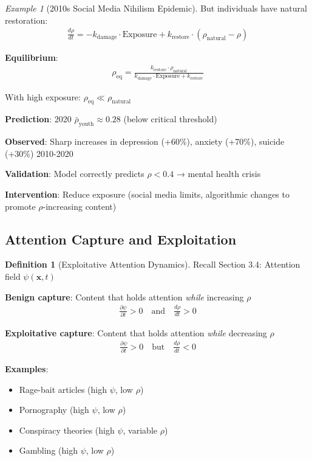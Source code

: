 \documentclass[11pt,a4paper]{article}
\theoremstyle{definition}
\newtheorem{definition}{Definition}[section]
\theoremstyle{remark}
\newtheorem{example}{Example}[section]
\begin{document}
\begin{enumerate}
\begin{example}[2010s Social Media Nihilism Epidemic]
But individuals have natural restoration:
\begin{align}
\frac{d\rho}{dt} = -k_{\text{damage}} \cdot \text{Exposure} + k_{\text{restore}} \cdot (\rho_{\text{natural}} - \rho)
\end{align}

\textbf{Equilibrium}:
\begin{align}
\rho_{\text{eq}} = \frac{k_{\text{restore}} \cdot \rho_{\text{natural}}}{k_{\text{damage}} \cdot \text{Exposure} + k_{\text{restore}}}
\end{align}

With high exposure: \(\rho_{\text{eq}} \ll \rho_{\text{natural}}\)

\textbf{Prediction}: 2020 \(\bar{\rho}_{\text{youth}} \approx 0.28\) (below critical threshold)

\textbf{Observed}: Sharp increases in depression (+60\%), anxiety (+70\%), suicide (+30\%) 2010-2020

\textbf{Validation}: Model correctly predicts \(\rho < 0.4\) → mental health crisis

\textbf{Intervention}: Reduce exposure (social media limits, algorithmic changes to promote \(\rho\)-increasing content)
\end{example}

\subsection{Attention Capture and Exploitation}

\begin{definition}[Exploitative Attention Dynamics]
Recall Section 3.4: Attention field \(\psi(\mathbf{x}, t)\)

\textbf{Benign capture}: Content that holds attention \textit{while} increasing \(\rho\)
\begin{align}
\frac{\partial \psi}{\partial t} > 0 \quad \text{and} \quad \frac{d\rho}{dt} > 0
\end{align}

\textbf{Exploitative capture}: Content that holds attention \textit{while} decreasing \(\rho\)
\begin{align}
\frac{\partial \psi}{\partial t} > 0 \quad \text{but} \quad \frac{d\rho}{dt} < 0
\end{align}

\textbf{Examples}:
\begin{itemize}
    \item Rage-bait articles (high \(\psi\), low \(\rho\))
    \item Pornography (high \(\psi\), low \(\rho\))
    \item Conspiracy theories (high \(\psi\), variable \(\rho\))
    \item Gambling (high \(\psi\), low \(\rho\))
\end{itemize}


\end{definition}
\end{enumerate}
\end{document}
